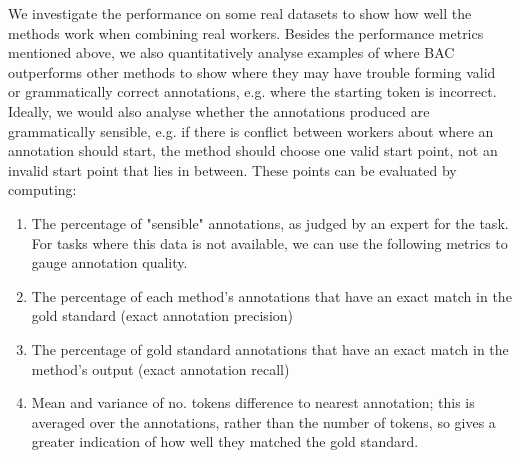 We investigate the performance on some real datasets to show how well the methods work when combining real workers. Besides the performance metrics mentioned above, we also quantitatively analyse examples of where BAC outperforms other methods to show where they may have trouble forming valid or grammatically correct annotations, e.g. where the starting token is incorrect. 
Ideally, we would also analyse whether the annotations produced are grammatically sensible, e.g. if there is conflict between workers about where an annotation should start, the method should choose one valid start point, not an invalid start point that lies in between. These points can be evaluated by computing:
\begin{enumerate}
\item The percentage of "sensible" annotations, as judged by an expert for the task. For tasks where this data is not available, we can use the following metrics to gauge annotation quality.
\item The percentage of each method's annotations that have an exact match in the gold standard (exact annotation precision)
\item The percentage of gold standard annotations that have an exact match in the method's output (exact annotation recall)
\item Mean and variance of no. tokens difference to nearest annotation; this is averaged over the annotations, rather than the number of tokens, so gives a greater indication of how well they matched the gold standard.
\end{enumerate}

